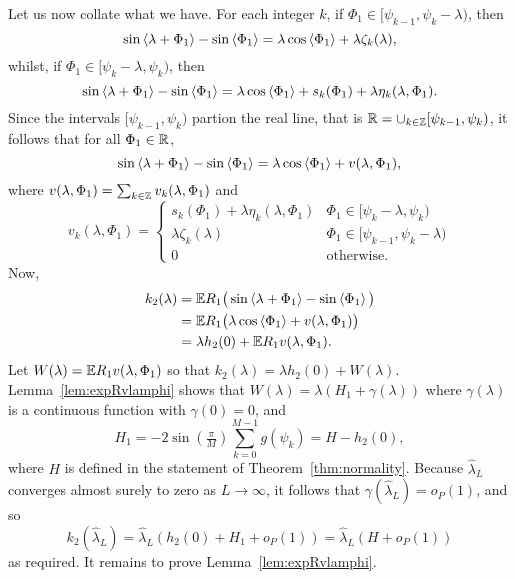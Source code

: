 \documentclass[journal]{IEEEtran}
\begin{document}
\begin{IEEEproof}
Let us now collate what we have.  For each integer $k$, if $\Phi_1 \in [\psi_{k-1}, \psi_{k} - \lambda )$, then
\[
\sin\left\langle \lambda + \Phi_1 \right\rangle - \sin\left\langle \Phi_1 \right\rangle = \lambda\cos\left\langle \Phi_1 \right\rangle + \lambda\zeta_k(\lambda),
\]
whilst, if $\Phi_1 \in [ \psi_{k} - \lambda,\psi_{k})$, then
\[
\sin\left\langle \lambda + \Phi_1 \right\rangle - \sin\left\langle \Phi_1 \right\rangle = \lambda \cos\left\langle \Phi_1 \right\rangle + s_k(\Phi_1) + \lambda\eta_k(\lambda, \Phi_1).
\]
Since the intervals $[\psi_{k-1}, \psi_{k})$ partion the real line, that is ${\mathbb R} = \cup_{k\in{\mathbb Z}}[\psi_{k-1}, \psi_{k})$, it follows that for all $\Phi_1 \in {\mathbb R}$,
\[
\sin\left\langle \lambda + \Phi_1 \right\rangle - \sin\left\langle \Phi_1 \right\rangle = \lambda\cos\left\langle \Phi_1 \right\rangle +  v(\lambda, \Phi_1),
\]
where $v(\lambda, \Phi_1) = \sum_{k\in{\mathbb Z}} v_k(\lambda, \Phi_1)$ and
\begin{equation}\label{eq:vk}
v_k(\lambda,\Phi_1) = \begin{cases}
s_k(\Phi_1) + \lambda\eta_k(\lambda, \Phi_1) &  \Phi_1 \in [ \psi_{k} - \lambda,\psi_{k} ) \\
\lambda\zeta_k(\lambda) & \Phi_1 \in [\psi_{k-1}, \psi_{k} - \lambda ) \\
0 & \text{otherwise}.
\end{cases} 
\end{equation}
Now,
\begin{align*}
k_2(\lambda) &=  {\mathbb E} R_1\big( \sin\left\langle \lambda + \Phi_1 \right\rangle - \sin\left\langle \Phi_1 \right\rangle \big) \\
&= {\mathbb E} R_1\big( \lambda\cos\left\langle \Phi_1 \right\rangle + v(\lambda, \Phi_1)  \big) \\
&= \lambda h_2(0) + {\mathbb E} R_1 v(\lambda, \Phi_1).
\end{align*}
Let $W(\lambda) = {\mathbb E} R_1 v(\lambda, \Phi_1)$ so that $k_2(\lambda) = \lambda h_2(0) + W(\lambda).$  Lemma~\ref{lem:expRvlamphi} shows that $W(\lambda) =  \lambda(H_1 + \gamma(\lambda))$ where $\gamma(\lambda)$ is a continuous function with $\gamma(0) = 0$, and
\[
H_1 = - 2 \sin(\tfrac{\pi}{M}) \sum_{k = 0}^{M-1} g(\psi_k) = H - h_2(0),
\]
where $H$ is defined in the statement of Theorem~\ref{thm:normality}.  Because $\hat{\lambda}_L$ converges almost surely to zero as $L \rightarrow\infty$, it follows that $\gamma(\hat{\lambda}_L) = o_P(1)$, and so
\[
k_2(\hat{\lambda}_L) = \hat{\lambda}_L ( h_2(0) + H_1 + o_P(1) ) = \hat{\lambda}_L ( H + o_P(1) )
\]
as required.  It remains to prove Lemma~\ref{lem:expRvlamphi}.
\end{IEEEproof}
\end{document}

